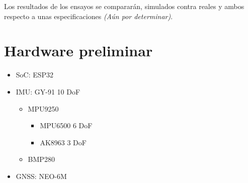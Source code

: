 \documentclass{sty/propuesta}
\begin{document}
Los resultados de los ensayos se compararán, simulados contra reales y ambos respecto a unas especificaciones \emph{(Aún por determinar)}.



\section{Hardware preliminar}
\begin{itemize}
    \item SoC: ESP32  \cite{invensense2016mpu9250}
    \item IMU: GY-91 10 DoF
        \begin{itemize}
            \item MPU9250 \cite{invensense2016mpu9250}
                \begin{itemize}
                    \item MPU6500 6 DoF
                    \item AK8963 3 DoF
                \end{itemize}
        \end{itemize}
        
        \begin{itemize}
            \item BMP280 \cite{bme_2024}
        \end{itemize}
    \item GNSS: NEO-6M
\end{itemize}


\printbibliography
\end{document}
